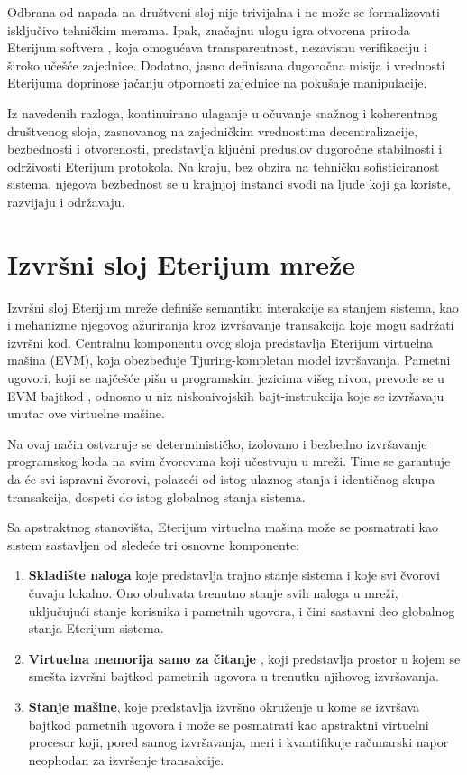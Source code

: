 Odbrana od napada na društveni sloj nije trivijalna i ne može se formalizovati isključivo tehničkim merama. Ipak, značajnu ulogu igra otvorena priroda Eterijum softvera , koja omogućava transparentnost, nezavisnu verifikaciju i široko učešće zajednice. Dodatno, jasno definisana dugoročna misija i vrednosti Eterijuma doprinose jačanju otpornosti zajednice na pokušaje manipulacije.

Iz navedenih razloga, kontinuirano ulaganje u očuvanje snažnog i koherentnog društvenog sloja, zasnovanog na zajedničkim vrednostima decentralizacije, bezbednosti i otvorenosti, predstavlja ključni preduslov dugoročne stabilnosti i održivosti Eterijum protokola. Na kraju, bez obzira na tehničku sofisticiranost sistema, njegova bezbednost se u krajnjoj instanci svodi na ljude koji ga koriste, razvijaju i održavaju.

\section{Izvršni sloj Eterijum mreže}
Izvršni sloj Eterijum mreže definiše semantiku interakcije sa stanjem sistema, kao i mehanizme njegovog ažuriranja kroz izvršavanje transakcija koje mogu sadržati izvršni kod. Centralnu komponentu ovog sloja predstavlja Eterijum virtuelna mašina (EVM), koja obezbeđuje Tjuring-kompletan model izvršavanja. Pametni ugovori, koji se najčešće pišu u programskim jezicima višeg nivoa, prevode se u EVM bajtkod , odnosno u niz niskonivojskih bajt-instrukcija koje se izvršavaju unutar ove virtuelne mašine.

Na ovaj način ostvaruje se determinističko, izolovano i bezbedno izvršavanje programskog koda na svim čvorovima koji učestvuju u mreži. Time se garantuje da će svi ispravni čvorovi, polazeći od istog ulaznog stanja i identičnog skupa transakcija, dospeti do istog globalnog stanja sistema.

Sa apstraktnog stanovišta, Eterijum virtuelna mašina može se posmatrati kao sistem sastavljen od sledeće tri osnovne komponente:
\begin{enumerate}
\item \textbf{Skladište naloga} koje predstavlja trajno stanje sistema i koje svi čvorovi čuvaju lokalno. Ono obuhvata trenutno stanje svih naloga u mreži, uključujući stanje korisnika i pametnih ugovora, i čini sastavni deo globalnog stanja Eterijum sistema.
\item \textbf{Virtuelna memorija samo za čitanje }, koji predstavlja prostor u kojem se smešta izvršni bajtkod pametnih ugovora u trenutku njihovog izvršavanja.
\item \textbf{Stanje mašine}, koje predstavlja izvršno okruženje u kome se izvršava bajtkod pametnih ugovora i može se posmatrati kao apstraktni virtuelni procesor koji, pored samog izvršavanja, meri i kvantifikuje računarski napor neophodan za izvršenje transakcije.
\end{enumerate}

